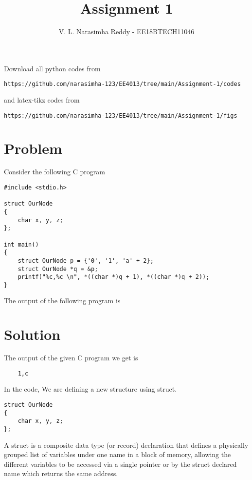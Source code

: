 \documentclass[journal,12pt,twocolumn]{IEEEtran}
\begin{document}
\def\putbox#1#2#3{\makebox[0in][l]{\makebox[#1][l]{}\raisebox{\baselineskip}[0in][0in]{\raisebox{#2}[0in][0in]{#3}}}}
\def\rightbox#1{\makebox[0in][r]{#1}}
\def\centbox#1{\makebox[0in]{#1}}
\def\topbox#1{\raisebox{-\baselineskip}[0in][0in]{#1}}
\def\midbox#1{\raisebox{-0.5\baselineskip}[0in][0in]{#1}}
\vspace{3cm}
\title{Assignment 1}
\author{V. L. Narasimha Reddy - EE18BTECH11046}
\maketitle
\newpage
\bigskip
\renewcommand{\thefigure}{\theenumi}
\renewcommand{\thetable}{\theenumi}
Download all python codes from
\begin{lstlisting}
https://github.com/narasimha-123/EE4013/tree/main/Assignment-1/codes
\end{lstlisting}
%
and latex-tikz codes from
%
\begin{lstlisting}
https://github.com/narasimha-123/EE4013/tree/main/Assignment-1/figs
\end{lstlisting}
\section{Problem}
Consider the following C program
\begin{lstlisting}
#include <stdio.h>

struct OurNode
{
    char x, y, z;
};

int main()
{
    struct OurNode p = {'0', '1', 'a' + 2};
    struct OurNode *q = &p;
    printf("%c,%c \n", *((char *)q + 1), *((char *)q + 2));
}
\end{lstlisting}

The output of the following program is

\section{Solution}

The output of the given C program we get is
\begin{lstlisting}
    1,c
\end{lstlisting}

In the code, We are defining a new structure using struct.
\begin{lstlisting}
struct OurNode
{
    char x, y, z;
};
\end{lstlisting}

A struct is a composite data type (or record) declaration that defines a
physically grouped list of variables under one name in a block of memory,
allowing the different variables to be accessed via a single pointer or
by the struct declared name which returns the same address.
\end{document}
